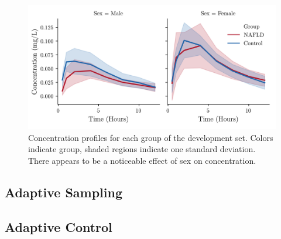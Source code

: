 \begin{figure}[t!]
	\centering
	\includegraphics{Figures/data_summary}
	\caption[Concentration profiles for development set]{Concentration profiles for each group of the development set.  Colors indicate group, shaded regions indicate one standard deviation.  There appears to be a noticeable effect of sex on concentration.}
	\label{datasummary}
\end{figure}







\subsection{Adaptive Sampling}

\subsection{Adaptive Control}
